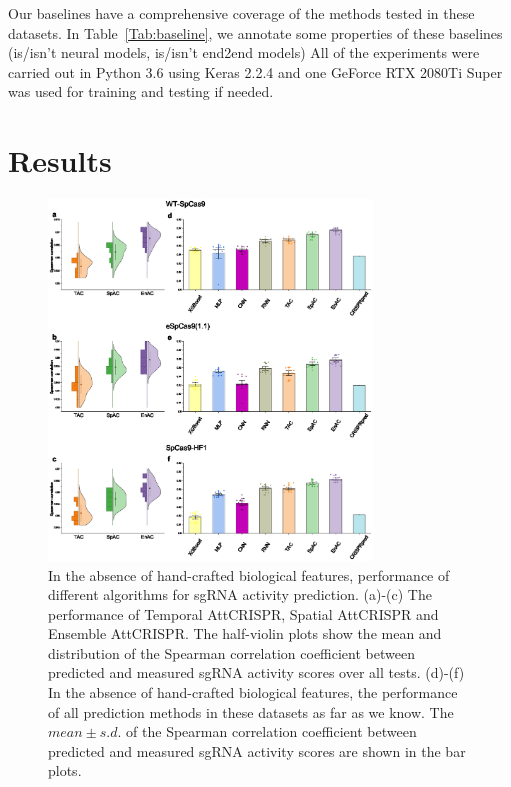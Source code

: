 \documentclass{bioinfo}
\begin{document}
Our baselines have a comprehensive coverage of the methods tested in these datasets. 
In Table~\ref{Tab:baseline}, we annotate some properties of these baselines (is/isn't neural models, is/isn't end2end models)
All of the experiments were carried out in Python 3.6 using Keras 2.2.4 and one GeForce RTX 2080Ti Super was used for training and testing if needed. 

\section{Results}
\begin{figure}[!tpb]
    \centerline{\includegraphics[width=86mm]{baselinewithoutbiofeat.eps}}
    \caption{In the absence of hand-crafted biological features, performance of different algorithms for sgRNA activity prediction. 
    (a)-(c) The performance of Temporal AttCRISPR, Spatial AttCRISPR and Ensemble AttCRISPR. 
    The half-violin plots show the mean and distribution of the Spearman correlation coefficient between predicted and measured sgRNA activity scores over all tests. 
    (d)-(f) In the absence of hand-crafted biological features, the performance of all prediction methods in these datasets as far as we know. 
    The $mean \pm s.d.$ of the Spearman correlation coefficient between predicted and measured sgRNA activity scores are shown in the bar plots.}\label{fig:06}
\end{figure}
\end{document}

